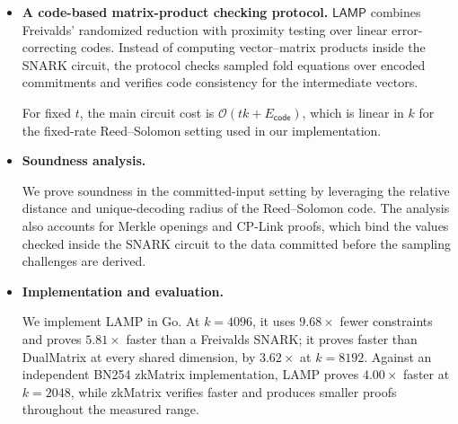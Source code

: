 \documentclass[conference,compsoc]{IEEEtran}
\makeatletter
\newif\ifshowrevisions
\newenvironment{revblock}[1][]
  {%
    \ifshowrevisions
      \begin{tcolorbox}[
        breakable,
        colback=revisionyellow,
        colframe=revisionyellow,
        boxrule=0pt,
        arc=0pt,
        left=2pt,
        right=2pt,
        top=2pt,
        bottom=2pt,
        before skip=2pt,
        after skip=2pt,
        #1
      ]
    \fi
  }
  {%
    \ifshowrevisions
      \end{tcolorbox}
    \fi
  }
\newcommand{\protocol}{\textsf{LAMP}}   %
\theoremstyle{plain}
\theoremstyle{definition}
\theoremstyle{remark}
\providecommand{\DIFaddtex}[1]{{\protect\color{blue}\uwave{#1}}} %
\providecommand{\DIFdeltex}[1]{{\protect\color{red}\sout{#1}}} %
\providecommand{\DIFaddbegin}{} %
\providecommand{\DIFaddend}{} %
\providecommand{\DIFdelbegin}{} %
\providecommand{\DIFdelend}{} %
\providecommand{\DIFadd}[1]{\texorpdfstring{\DIFaddtex{#1}}{#1}} %
\providecommand{\DIFdel}[1]{\texorpdfstring{\DIFdeltex{#1}}{}} %
\let\sout@orig\sout %
\renewcommand{\sout}[1]{\ifmmode\text{\sout@orig{\ensuremath{#1}}}\else\sout@orig{#1}\fi} %
\renewcommand{\DIFaddtex}[1]{{\protect\color{DiffBlue}#1}}
\renewcommand{\DIFdeltex}[1]{}
\makeatother
\begin{document}
\begin{itemize}
  \item \textbf{A code-based matrix-product checking protocol.}
  \(\protocol\) combines Freivalds' randomized reduction with proximity testing
  over linear error-correcting codes.  Instead of computing vector--matrix
  products inside the SNARK circuit, the protocol checks sampled fold equations
  over encoded commitments and verifies code consistency for the intermediate
  vectors. 

  For fixed \(t\), the main circuit cost is
  \(\mathcal{O}(tk+E_{\mathsf{code}})\), which is linear in \(k\) for the
  fixed-rate Reed--Solomon setting used in our implementation.

  \item \textbf{Soundness analysis.}
  \begin{revblock}
  We prove soundness in the committed-input setting by leveraging the relative
  distance and unique-decoding radius of the Reed--Solomon code.  The analysis
  also accounts for Merkle openings and CP-Link proofs, which bind the values
  checked inside the SNARK circuit to the data committed before the sampling
  challenges are derived.
  \end{revblock}

  \item \textbf{Implementation and evaluation.}
  \begin{revblock}
  We implement \DIFdelbegin \DIFdel{\(\protocol\) in Goand evaluate it against a Freivalds-based
  SNARK baseline and DualMatrix. In the square-matrix experiments with
  \(\rho=1/2\) and \(t=309\), \(\protocol\) reduces the constraint count by
  }\DIFdelend \DIFaddbegin \DIFadd{LAMP in Go. At \(k=4096\), it uses }\DIFaddend \(9.68\times\) \DIFdelbegin \DIFdel{and proving time by }%
\DIFdel{relative to the Freivalds baseline at \(k=2^{12}\).  It also }\DIFdelend \DIFaddbegin \DIFadd{fewer
  constraints and }\DIFaddend proves \DIFaddbegin \DIFadd{\(5.81\times\) faster than a Freivalds SNARK; it
  proves }\DIFaddend faster than DualMatrix at every \DIFdelbegin \DIFdel{matrix dimensionmeasured for both systems, achieving a }%
\DIFdel{speedup at \(k=2^{13}\). }\DIFdelend \DIFaddbegin \DIFadd{shared dimension, by \(3.62\times\)
  at \(k=8192\). Against an independent BN254 zkMatrix implementation, LAMP
  proves \(4.00\times\) faster at \(k=2048\), while zkMatrix verifies faster
  and produces smaller proofs throughout the measured range.
}\DIFaddend 


\end{revblock}
\end{itemize}
\end{document}
